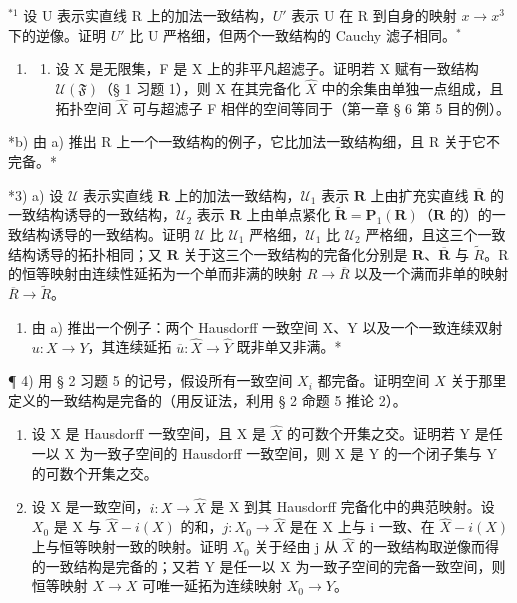 \BourbakiExerciseGroup

\(^{*1}\) 设 U 表示实直线 R 上的加法一致结构，\(U'\) 表示 U 在 R 到自身的映射 \(x \rightarrow x^{3}\) 下的逆像。证明 \(U'\) 比 U 严格细，但两个一致结构的 Cauchy 滤子相同。\(^{*}\)

\begin{enumerate}
\def\labelenumi{\arabic{enumi})}
\setcounter{enumi}{1}
\tightlist
\item
  \begin{enumerate}
  \def\labelenumii{\alph{enumii})}
  \tightlist
  \item
    设 X 是无限集，F 是 X 上的非平凡超滤子。证明若 X 赋有一致结构 \(\mathcal{U}(\mathfrak{F})\)（§ 1 习题 1），则 X 在其完备化 \(\hat{X}\) 中的余集由单独一点组成，且拓扑空间 \(\hat{X}\) 可与超滤子 F 相伴的空间等同于（第一章 § 6 第 5 目的例）。
  \end{enumerate}
\end{enumerate}

*b) 由 a) 推出 R 上一个一致结构的例子，它比加法一致结构细，且 R 关于它不完备。*

*3) a) 设 \(\mathcal{U}\) 表示实直线 \(\mathbf{R}\) 上的加法一致结构，\(\mathcal{U}_1\) 表示 \(\mathbf{R}\) 上由扩充实直线 \(\overline{\mathbf{R}}\) 的一致结构诱导的一致结构，\(\mathcal{U}_2\) 表示 \(\mathbf{R}\) 上由单点紧化 \(\tilde{\mathbf{R}} = \mathbf{P}_1(\mathbf{R})\)（\(\mathbf{R}\) 的）的一致结构诱导的一致结构。证明 \(\mathcal{U}\) 比 \(\mathcal{U}_1\) 严格细，\(\mathcal{U}_1\) 比 \(\mathcal{U}_2\) 严格细，且这三个一致结构诱导的拓扑相同；又 \(\mathbf{R}\) 关于这三个一致结构的完备化分别是 \(\mathbf{R}\)、\(\overline{\mathbf{R}}\) 与 \(\tilde{R}\)。R 的恒等映射由连续性延拓为一个单而非满的映射 \(R \rightarrow \overline{R}\) 以及一个满而非单的映射 \(\overline{R} \rightarrow \tilde{R}\)。

\begin{enumerate}
\def\labelenumi{\alph{enumi})}
\setcounter{enumi}{1}
\tightlist
\item
  由 a) 推出一个例子：两个 Hausdorff 一致空间 X、Y 以及一个一致连续双射 \(u: X \rightarrow Y\)，其连续延拓 \(\overline{u}: \hat{X} \rightarrow \hat{Y}\) 既非单又非满。*
\end{enumerate}

¶ 4) 用 § 2 习题 5 的记号，假设所有一致空间 \(X_i\) 都完备。证明空间 \(X\) 关于那里定义的一致结构是完备的（用反证法，利用 § 2 命题 5 推论 2）。

\begin{enumerate}
\def\labelenumi{\arabic{enumi})}
\setcounter{enumi}{4}
\item
  设 X 是 Hausdorff 一致空间，且 X 是 \(\hat{X}\) 的可数个开集之交。证明若 Y 是任一以 X 为一致子空间的 Hausdorff 一致空间，则 X 是 Y 的一个闭子集与 Y 的可数个开集之交。
\item
  设 X 是一致空间，\(i: X \to \hat{X}\) 是 X 到其 Hausdorff 完备化中的典范映射。设 \(X_{0}\) 是 X 与 \(\hat{X} - i(X)\) 的和，\(j: X_{0} \to \hat{X}\) 是在 X 上与 i 一致、在 \(\hat{X} - i(X)\) 上与恒等映射一致的映射。证明 \(X_{0}\) 关于经由 j 从 \(\hat{X}\) 的一致结构取逆像而得的一致结构是完备的；又若 Y 是任一以 X 为一致子空间的完备一致空间，则恒等映射 \(X \to X\) 可唯一延拓为连续映射 \(X_{0} \to Y\)。
\end{enumerate}

